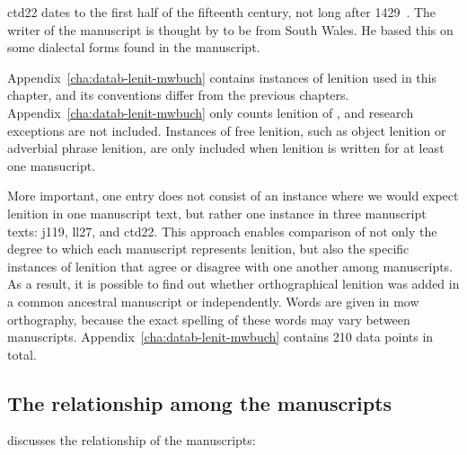 \Acrfull{ctd22} dates to the first half of the fifteenth century, not long after 1429~\autocite{Eva_Welsh88}. The writer of the manuscript is thought by \textcite[107]{Pow_description81} to be from South Wales. He based this on some dialectal forms found in the manuscript.

Appendix~\ref{cha:datab-lenit-mwbuch} contains instances of lenition used in this chapter, and its conventions differ from the previous chapters. Appendix~\ref{cha:datab-lenit-mwbuch} only counts lenition of , and research exceptions are not included. Instances of free lenition, such as object lenition or adverbial phrase lenition, are only included when lenition is written for at least one mansucript.

More important, one entry does not consist of an instance where we would expect lenition in one manuscript text, but rather one instance in three manuscript texts: \gls{j119}, \gls{ll27}, and \gls{ctd22}. This approach enables comparison of not only the degree to which each manuscript represents lenition, but also the specific instances of lenition that agree or disagree with one another among manuscripts. As a result, it is possible to find out whether orthographical lenition was added in a common ancestral manuscript or independently. Words are given in \gls{mow} orthography, because the exact spelling of these words may vary between manuscripts.  Appendix~\ref{cha:datab-lenit-mwbuch} contains 210 data points in total.


\subsection{The relationship among the manuscripts}
\label{sec:relat-betw-manuscr}
\textcite{Eva_Welsh88} discusses the relationship of the manuscripts:


